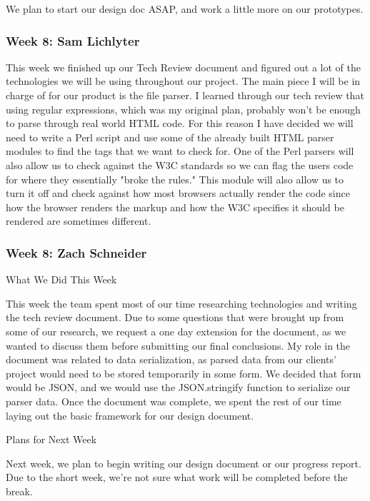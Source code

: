 We plan to start our design doc ASAP, and work a little more on our prototypes. \\ 

 

 \subsubsection{Week 8: Sam Lichlyter}

This week we finished up our Tech Review document and figured out a lot of the technologies we will be using throughout our project. The main piece I will be in charge of for our product is the file parser. I learned through our tech review that using regular expressions, which was my original plan, probably won't be enough to parse through real world HTML code. For this reason I have decided we will need to write a Perl script and use some of the already built HTML parser modules to find the tags that we want to check for. One of the Perl parsers will also allow us to check against the W3C standards so we can flag the users code for where they essentially "broke the rules." This module will also allow us to turn it off and check against how most browsers actually render the code since how the browser renders the markup and how the W3C specifies it should be rendered are sometimes different. \\ 

 \subsubsection{Week 8: Zach Schneider}

What We Did This Week

This week the team spent most of our time researching technologies and writing the tech review document. Due to some questions that were brought up from some of our research, we request a one day extension for the document, as we wanted to discuss them before submitting our final conclusions. My role in the document was related to data serialization, as parsed data from our clients' project would need to be stored temporarily in some form. We decided that form would be JSON, and we would use the JSON.stringify function to serialize our parser data. Once the document was complete, we spent the rest of our time laying out the basic framework for our design document.

Plans for Next Week

Next week, we plan to begin writing our design document or our progress report. Due to the short week, we're not sure what work will be completed before the break.  \\ 

